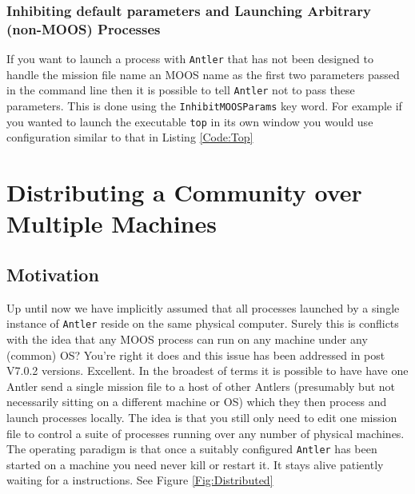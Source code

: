 \documentclass[a4paper,10pt]{article}
\newcommand{\Code}[1]{\texttt{#1} }
\newcommand{\code}[1]{\Code{#1} }
\begin{document}
\subsubsection{Inhibiting default parameters and Launching Arbitrary (non-MOOS) Processes}

If you want to launch a process with \code{Antler} that has not been designed to handle the mission file name an MOOS name as the first two parameters passed in the command line then it is possible to tell \code{Antler} not to pass these parameters. This is done using the \code{InhibitMOOSParams}  key word. For example if you wanted to launch the executable \code{top} in its own window you would use configuration similar to that in Listing \ref{Code:Top}


 


\section{Distributing  a Community over Multiple Machines}

\subsection{Motivation}

Up until now we have implicitly assumed that all processes launched by a single instance of \code{Antler} reside on the same physical computer. Surely this is conflicts with the idea that any MOOS process can run on any machine under any (common) OS? You're right it does and this issue has been addressed in post V7.0.2 versions. Excellent. In the broadest of terms it is possible to have have one Antler send a single mission file to a host of other Antlers (presumably but not necessarily sitting on a different machine or OS) which they then process and launch processes locally. The idea is that you still only need to edit one mission file to control a suite of processes running over any number of physical machines. The operating paradigm is that once a suitably configured \code{Antler} has been started on a machine you need never kill or restart it. It stays alive patiently waiting for a instructions. See Figure \ref{Fig:Distributed}
\end{document}
